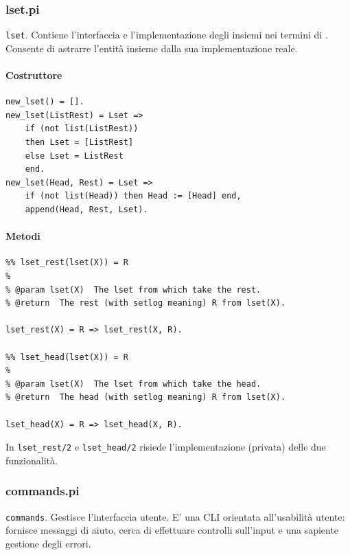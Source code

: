 \documentclass[12pt,a4paper,openright]{book} %
\begin{document}
\subsubsection{lset.pi}

\verb|lset|. Contiene l'interfaccia e l'implementazione degli insiemi nei termini di \lset{}. Consente di astrarre l'entità insieme dalla sua implementazione reale.

\paragraph{Costruttore}
\begin{verbatim}
new_lset() = [].
new_lset(ListRest) = Lset => 
    if (not list(ListRest)) 
    then Lset = [ListRest]
    else Lset = ListRest
    end.
new_lset(Head, Rest) = Lset =>
    if (not list(Head)) then Head := [Head] end,
    append(Head, Rest, Lset).
\end{verbatim}

\paragraph{Metodi}
\begin{verbatim}
%% lset_rest(lset(X)) = R
%
% @param lset(X)  The lset from which take the rest.
% @return  The rest (with setlog meaning) R from lset(X).

lset_rest(X) = R => lset_rest(X, R).

%% lset_head(lset(X)) = R
%
% @param lset(X)  The lset from which take the head.
% @return  The head (with setlog meaning) R from lset(X).

lset_head(X) = R => lset_head(X, R).
\end{verbatim}
In \verb|lset_rest/2| e \verb|lset_head/2| risiede l'implementazione (privata) delle due funzionalità.

\subsubsection{commands.pi}

\verb|commands|. Gestisce l'interfaccia utente. E' una CLI orientata all'usabilità utente: fornisce messaggi di aiuto, cerca di effettuare controlli sull'input e una sapiente gestione degli errori.
\end{document}
